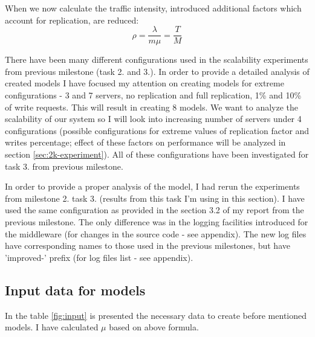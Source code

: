 \documentclass[11pt]{article}
\begin{document}
When we now calculate the traffic intensity, introduced additional factors which account for replication, are reduced:
$$\rho = \frac{\lambda}{m \mu} = \frac{T}{M}$$
\fi

There have been many different configurations used in the scalability experiments from previous milestone (task 2. and 3.). In order to provide a detailed analysis of created models I have focused my attention on creating models for extreme configurations - 3 and 7 servers, no replication and full replication, 1\% and 10\% of write requests. This will result in creating 8 models. We want to analyze the scalability of our system so I will look into increasing number of servers under 4 configurations (possible configurations for extreme values of replication factor and writes percentage; effect of these factors on performance will be analyzed in section \ref{sec:2k-experiment}). All of these configurations have been investigated for task 3. from previous milestone.

In order to provide a proper analysis of the model, I had rerun the experiments from milestone 2. task 3. (results from this task I'm using in this section). I have used the same configuration as provided in the section 3.2 of my report from the previous milestone. The only difference was in the logging facilities introduced for the middleware (for changes in the source code - see appendix). The new log files have corresponding names to those used in the previous milestones, but have 'improved-' prefix (for log files list - see appendix).


\subsection{Input data for models}

In the table \ref{fig:input} is presented the necessary data to create before mentioned models. I have calculated $\mu$ based on above formula.
\end{document}
